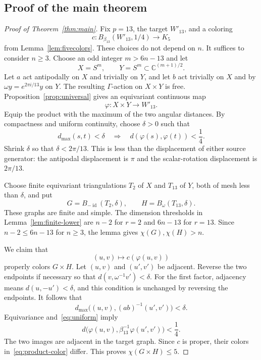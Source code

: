 \documentclass[11pt]{amsart}
\theoremstyle{definition}
\theoremstyle{remark}
\numberwithin{equation}{section}
\newcommand{\C}{\mathbb C}
\newcommand{\id}{\operatorname{id}}
\begin{document}
\subsection{Proof of the main theorem}

\begin{proof}[Proof of Theorem~\ref{thm:main}]
Fix $p=13$, the target $W'_{13}$, and a coloring
\[
 c:B_{\beta_{13}}(W'_{13},1/4)\longrightarrow K_5
\]
from Lemma~\ref{lem:fivecolors}. These choices do not depend on $n$. It suffices to consider $n\geq3$. Choose an odd integer $m>6n-13$ and let
\[
 X=S^m,\qquad Y=S^m\subset\C^{(m+1)/2}.
\]
Let $a$ act antipodally on $X$ and trivially on $Y$, and let $b$ act trivially on $X$ and by $\omega y=e^{2\pi i/13}y$ on $Y$. The resulting $\Gamma$-action on $X\times Y$ is free. Proposition~\ref{prop:universal} gives an equivariant continuous map
\[
 \varphi:X\times Y\longrightarrow W'_{13}.
\]
Equip the product with the maximum of the two angular distances. By compactness and uniform continuity, choose $\delta>0$ such that
\begin{equation}\label{eq:uniform}
 d_{\max}(s,t)<\delta
 \quad\Longrightarrow\quad
 d(\varphi(s),\varphi(t))<\frac14.
\end{equation}
Shrink $\delta$ so that $\delta<2\pi/13$. This is less than the displacement of either source generator: the antipodal displacement is $\pi$ and the scalar-rotation displacement is $2\pi/13$.

Choose finite equivariant triangulations $T_2$ of $X$ and $T_{13}$ of $Y$, both of mesh less than $\delta$, and put
\[
 G=B_{-\id}(T_2,\delta),\qquad
 H=B_\omega(T_{13},\delta).
\]
These graphs are finite and simple. The dimension thresholds in Lemma~\ref{lem:finite-lower} are $n-2$ for $r=2$ and $6n-13$ for $r=13$. Since $n-2\leq6n-13$ for $n\geq3$, the lemma gives $\chi(G),\chi(H)>n$.

We claim that
\begin{equation}\label{eq:product-color}
 (u,v)\longmapsto c(\varphi(u,v))
\end{equation}
properly colors $G\times H$. Let $(u,v)$ and $(u',v')$ be adjacent. Reverse the two endpoints if necessary so that $d(v,\omega^{-1}v')<\delta$. For the first factor, adjacency means $d(u,-u')<\delta$, and this condition is unchanged by reversing the endpoints. It follows that
\[
 d_{\max}\bigl((u,v),(ab)^{-1}(u',v')\bigr)<\delta.
\]
Equivariance and~\eqref{eq:uniform} imply
\[
 d\bigl(\varphi(u,v),\beta_{13}^{-1}\varphi(u',v')\bigr)<\frac14.
\]
The two images are adjacent in the target graph. Since $c$ is proper, their colors in~\eqref{eq:product-color} differ. This proves $\chi(G\times H)\leq5$.
\end{proof}
\end{document}
